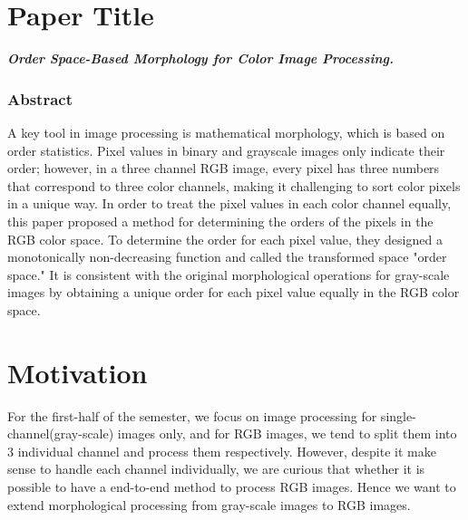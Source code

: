 \section*{Paper Title}
\textbf{\textit{Order Space-Based Morphology for Color Image Processing.}}


\subsubsection*{Abstract}
A key tool in image processing is mathematical morphology, which is based on order statistics. Pixel values in binary and grayscale images only indicate their order; however, in a three channel RGB image, every pixel has three numbers that correspond to three color channels, making it challenging to sort color pixels in a unique way. In order to treat the pixel values in each color channel equally, this paper proposed a method for determining the orders of the pixels in the RGB color space. To determine the order for each pixel value, they designed a monotonically non-decreasing function and called the transformed space "order space." It is consistent with the original morphological operations for gray-scale images by obtaining a unique order for each pixel value equally in the RGB color space. 

\section*{Motivation}
For the first-half of the semester, we focus on image processing for single-channel(gray-scale) images only, and for RGB images, we tend to split them into 3 individual channel and process them respectively. However, despite it make sense to handle each channel individually, we are curious that whether it is possible to have a end-to-end method to process RGB images. Hence we want to extend morphological processing from gray-scale images to RGB images.

